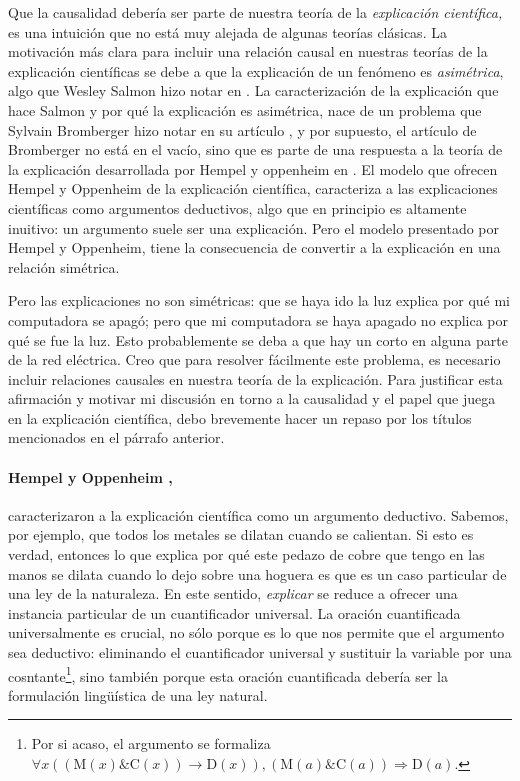 Que la causalidad debería ser parte de nuestra teoría de la \emph
{explicación científica,} es una intuición que no está muy alejada de
algunas teorías clásicas. La motivación más clara para incluir una
relación causal en nuestras teorías de la explicación científicas se
debe a que la explicación de un fenómeno es \emph{asimétrica}, algo
que Wesley Salmon hizo notar en . La
caracterización de la explicación que hace Salmon y por qué la
explicación es asimétrica, nace de un problema que Sylvain Bromberger
hizo notar en su artículo , y por supuesto,
el artículo de Bromberger no está en el vacío, sino que es parte de
una respuesta a la teoría de la explicación desarrollada por Hempel y
oppenheim en . El modelo que ofrecen Hempel y
Oppenheim de la explicación científica, caracteriza a las
explicaciones científicas como argumentos deductivos, algo que en
principio es altamente inuitivo: un argumento suele ser una
explicación. Pero el modelo presentado por Hempel y Oppenheim, tiene
la consecuencia de convertir a la explicación en una relación
simétrica.

Pero las explicaciones no son simétricas: que se haya ido la luz
explica por qué mi computadora se apagó; pero que mi computadora se
haya apagado no explica por qué se fue la luz. Esto probablemente se
deba a que hay un corto en alguna parte de la red eléctrica. Creo que
para resolver fácilmente este problema, es necesario incluir
relaciones causales en nuestra teoría de la explicación. Para
justificar esta afirmación y motivar mi discusión en torno a la
causalidad y el papel que juega en la explicación científica, debo
brevemente hacer un repaso por los títulos mencionados en el párrafo
anterior.

\paragraph{Hempel y Oppenheim \parencite{Hempel1948},} caracterizaron
a la
explicación científica como un argumento deductivo.
Sabemos, por ejemplo, que todos los metales se dilatan cuando se
calientan.
Si esto es verdad, entonces lo que explica por qué este pedazo de
cobre que tengo en las manos se dilata cuando lo dejo sobre una
hoguera es que es un caso particular de una ley de la naturaleza.
En este sentido, \emph{explicar} se reduce a ofrecer una instancia
particular de un cuantificador universal.
La oración cuantificada universalmente es crucial, no sólo porque es
lo que nos permite que el argumento sea deductivo: eliminando el
cuantificador universal y sustituir la variable por una
cosntante\footnote{ Por si acaso, el argumento se formaliza $\forall
  x ((\text{M}(x) \& \text{C}(x)) \rightarrow \text{D}(x)),
  (\text{M}(a) \& \text{C}(a)) \Rightarrow \text{D}(a)$.
}, sino también porque esta oración cuantificada debería ser la
formulación lingüística de una ley natural.


